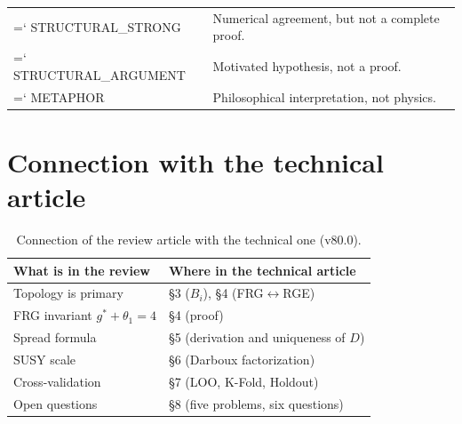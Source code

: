 \documentclass[11pt,a4paper]{article}
\renewcommand{\texttt}[1]{{\ttfamily\hyphenchar\font=`\- #1}}
\theoremstyle{definition}
\begin{document}
\begin{center}
\begin{longtable}{p{3.5cm}p{10cm}}
\texttt{STRUCTURAL\_STRONG} & 
    Numerical agreement, but not a complete proof. \\[0.3em]

\texttt{STRUCTURAL\_ARGUMENT} & 
    Motivated hypothesis, not a proof. \\[0.3em]

\texttt{METAPHOR} & 
    Philosophical interpretation, not physics. \\

\end{longtable}
\end{center}

\section{Connection with the technical article}
\label{app:technical-link}

\begin{table}[htbp]
\centering
\caption{Connection of the review article with the technical one (v80.0).}
\label{tab:app-technical-link}
\begin{tabular}{p{4.5cm}p{8cm}}
\toprule
What is in the review & Where in the technical article \\
\midrule
Topology is primary & §3 ($B_i$), §4 (FRG$\leftrightarrow$RGE) \\[0.3em]
FRG invariant $g^*+\theta_1 = 4$ & §4 (proof) \\[0.3em]
Spread formula & §5 (derivation and uniqueness of $D$) \\[0.3em]
SUSY scale & §6 (Darboux factorization) \\[0.3em]
Cross-validation & §7 (LOO, K-Fold, Holdout) \\[0.3em]
Open questions & §8 (five problems, six questions) \\
\bottomrule
\end{tabular}
\end{table}

\end{document}
